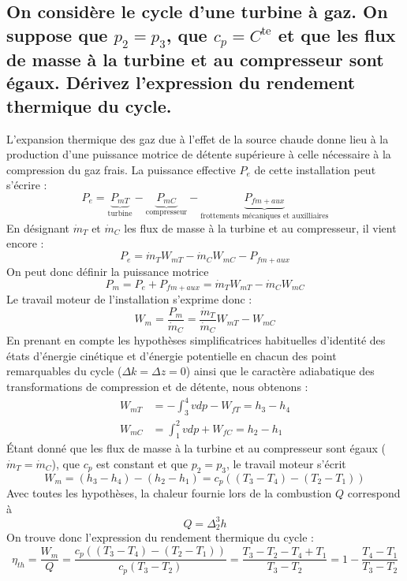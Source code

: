 \subsection{On considère le cycle d'une turbine à gaz. On suppose que $p_2 = p_3$, que $c_p = C^\text{te}$ et que les flux de masse à la turbine et au compresseur sont égaux. Dérivez l'expression du rendement thermique du cycle.}
L'expansion thermique des gaz due à l'effet de la source chaude donne lieu à la production d'une puissance motrice de détente supérieure à celle nécessaire à la compression du gaz frais. La puissance effective $P_e$ de cette installation peut s'écrire :
\begin{equation} P_e = \underbrace{P_{mT}}_{\text{turbine}} - \underbrace{P_{mC}}_{\text{compresseur}} - \underbrace{P_{fm+aux}}_{\text{frottements mécaniques et auxilliaires}} \end{equation} 
En désignant $\dot{m}_T$ et $\dot{m}_C$ les flux de masse à la turbine et au compresseur, il vient encore :
\begin{equation} P_e = \dot{m}_TW_{mT} - \dot{m}_CW_{mC} - P_{fm+aux} \end{equation}
On peut donc définir la puissance motrice 
\begin{equation} P_m = P_e + P_{fm+aux} = \dot{m}_TW_{mT} - \dot{m}_CW_{mC} \end{equation}
Le travail moteur de l'installation s'exprime donc :
\begin{equation} W_m = \frac{P_m}{\dot{m}_C} = \frac{\dot{m}_T}{\dot{m}_C}W_{mT}-W_{mC} \end{equation}
En prenant en compte les hypothèses simplificatrices habituelles d'identité des états d'énergie cinétique et d'énergie potentielle en chacun des point remarquables du cycle ($\Delta k = \Delta z = 0$) ainsi que le caractère adiabatique des transformations de compression et de détente, nous obtenons :
\begin{align} W_{mT} &= -\int^4_3vdp - W_{fT} = h_3-h_4 \\ W_{mC} &= \int^2_1vdp + W_{fC} = h_2-h_1 \end{align}
Étant donné que les flux de masse à la turbine et au compresseur sont égaux ($\dot{m}_T = \dot{m}_C$), que $c_p$ est constant et que $p_2 = p_3$, le travail moteur s'écrit  
\begin{equation} W_m = (h_3-h_4) - (h_2-h_1) = c_p\left((T_3-T_4) - (T_2-T_1)\right)\end{equation}
Avec toutes les hypothèses, la chaleur fournie lors de la combustion $Q$ correspond à 
\begin{equation} Q = \Delta^3_2h \end{equation}
On trouve donc l'expression du rendement thermique du cycle :
\begin{equation} \eta_{th} = \frac{W_m}{Q} = \frac{c_p((T_3-T_4)-(T_2-T_1))}{c_p(T_3-T_2)} = \frac{T_3-T_2-T_4+T_1}{T_3-T_2} = 1 - \frac{T_4-T_1}{T_3-T_2} \label{eq:q4_3}\end{equation}

